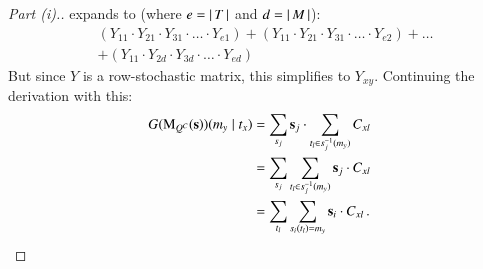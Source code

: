 \documentclass[fleqn,reqno,10pt]{article}
\renewcommand{\Smixed}{\ensuremath{\mathrm{\mathbf{s}}}}
\newcommand{\Mutate}{\ensuremath{\mathrm{M}}} %
\begin{document}
\begin{proof}[Part (i).]
  expands to (where $e = \left \lvert \, T \, \right\rvert$ and $d=\left \lvert \, M \, \right\rvert$):
  \begin{align*}
    & (Y_{11} \cdot Y_{21} \cdot Y_{31} \cdot \ldots \cdot Y_{e1}) +
    (Y_{11} \cdot Y_{21} \cdot Y_{31} \cdot \ldots \cdot Y_{e2}) + 
    \dots \\
    & + (Y_{11} \cdot Y_{2d} \cdot
    Y_{3d} \cdot \ldots \cdot
    Y_{ed}) 
  \end{align*}
  But since $Y$ is a row-stochastic matrix, this simplifies to
  $Y_{xy}$. Continuing the derivation with this:
  \begin{align*}
    G(\Mutate_{Q^C}(\Smixed))(\messg_y \probbar \state_x) 
    & = \sum_{\Spure_j} \Smixed_j \cdot
    \sum_{\state_l \in \Spure_j^{-1}(\messg_y)} C_{xl} \\
    & = \sum_{\Spure_j} \sum_{\state_l \in \Spure_j^{-1}(\messg_y)} \Smixed_j \cdot
     C_{xl} \\
     & = \sum_{\state_l}
    \sum_{\Spure_i(\state_l) = \messg_y} \Smixed_i \cdot C_{xl}\,.
  \end{align*}

\end{proof}
\end{document}
